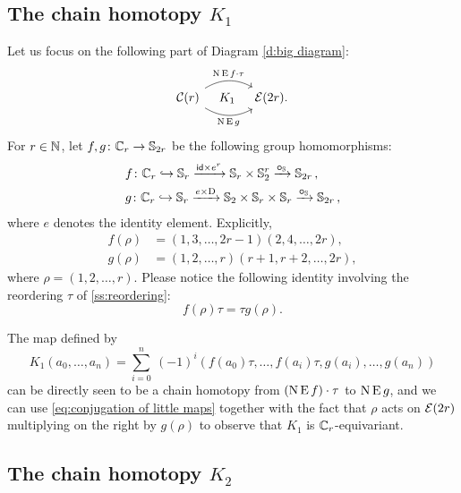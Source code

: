\subsection{The chain homotopy $K_1$}

Let us focus on the following part of Diagram \eqref{d:big diagram}:
\[
\begin{tikzcd}[column sep=large]
	\cC(r)
	\arrow[r,bend left,"\chains\EE f \cdot \tau"]
	\arrow[r,bend right,"\chains\EE g"']
	\arrow[r,phantom,"K_1"]
	& \BE(2r).
\end{tikzcd}
\]
For $r \in \mathbb{N}$, let $f,g \colon \mathbb{C}_r \to \mathbb{S}_{2r}$ be the following group homomorphisms:
\[
\begin{split}
	&f \colon \mathbb{C}_r \hookrightarrow \mathbb{S}_r \xrightarrow{\mathsf{id} \times e^r} \mathbb{S}_r \times \mathbb{S}_2^r \xrightarrow{\bm{\circ}_{\mathbb{S}}} \mathbb{S}_{2r}\,, \\
	&g \colon \mathbb{C}_r \hookrightarrow \mathbb{S}_r \xrightarrow{e \times \mathrm{D}} \mathbb{S}_2 \times \mathbb{S}_r \times \mathbb{S}_r \xrightarrow{\bm{\circ}_{\mathbb{S}}} \mathbb{S}_{2r}\,,
\end{split}
\]
where $e$ denotes the identity element.
Explicitly,
\begin{align*}
	f(\rho) &= (1,3,\dots,2r-1)(2,4,\dots,2r), \\
	g(\rho) &= (1,2,\dots,r)(r+1,r+2,\dots,2r),
\end{align*}
where $\rho = (1,2,\dots,r)$.
Please notice the following identity involving the reordering $\tau$ of \cref{ss:reordering}:
\begin{equation}\label{eq:conjugation of little maps}
	f(\rho) \tau = \tau g(\rho).
\end{equation}

The map defined by
\[
K_1(a_0,\dots,a_n) =
\sum_{i=0}^n \ (-1)^i (f(a_0) \tau, \dots, f(a_i) \tau, g(a_i), \dots, g(a_n))
\]
can be directly seen to be a chain homotopy from $(\operatorname{N} \operatorname{E} f) \cdot \tau$ to $\operatorname{N} \operatorname{E} g$, and we can use \cref{eq:conjugation of little maps} together with the fact that $\rho$ acts on $\mathcal{E}(2r)$ multiplying on the right by $g(\rho)$ to observe that $K_1$ is $\mathbb{C}_r$-equivariant.

\subsection{The chain homotopy $K_2$}

